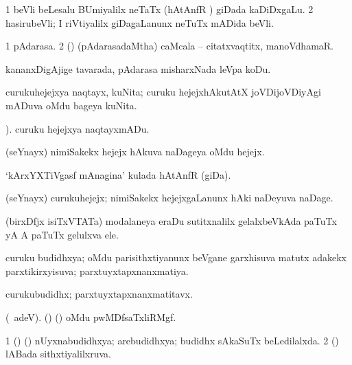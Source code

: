 \bentry
{}
\gl{\nA}
\expl{}
\bmng
\bnum
\num{1} beVli beLesalu BUmiyalilx neTaTx (hAtAnfR \mo) giDada kaDiDxgaLu. 
\num{2} hasirubeVli; I riVtiyalilx giDagaLanunx neTuTx mADida beVli. 
\enum
\emng
\eentry

\bentry
{}
\gl{\nA}
\bmng
\bnum
\num{1} pAdarasa. 
\num{2} (\rUpa) (pAdarasadaMtha) caMcala -- citatxvaqtitx, manoVdhamaR. 
\enum
\emng
\eentry

\bentry
{}
\gl{\sakirx}
\expl{}
\bmng
kananxDigAjige tavarada, pAdarasa misharxNada leVpa koDu. 
\emng
\eentry

\bentry
{}
\gl{\nA}
\bmng
curukuhejejxya naqtayx, kuNita; curuku hejejxhAkutAtX joVDijoVDiyAgi mADuva oMdu bageya kuNita. 
\emng
\eentry

\bentry
{}
\gl{\akirx}
).\bmng
curuku hejejxya naqtayxmADu. 
\emng
\eentry

\bentry
{}
\gl{\nA}
\bmng
(seYnayx) nimiSakekx  hejejx hAkuva naDageya oMdu hejejx. 
\emng
\eentry

\bentry
{}
\gl{\nA}
\bmng
`kArxYXTiVgasf mAnagina' kulada hAtAnfR (giDa). 
\emng
\eentry

\bentry
{}
\gl{\nA}
\bmng
(seYnayx) curukuhejejx; nimiSakekx  hejejxgaLanunx hAki naDeyuva naDage. 
\emng
\eentry

\bentry
{}
\gl{\nA}
\bmng
(birxDfjx isiTxVTATa) modalaneya eraDu sutitxnalilx gelalxbeVkAda paTuTx yA A paTuTx gelulxva ele. 
\emng
\eentry

\bentry
{}
\gl{\gu}
\bmng
curuku budidhxya; oMdu parisithxtiyanunx beVgane garxhisuva matutx adakekx parxtikirxyisuva; parxtuyxtapxnanxmatiya. 
\emng
\eentry

\bentry
{}
\gl{\nA}
\bmng
curukubudidhx; parxtuyxtapxnanxmatitavx. 
\emng
\eentry

\bentry
{}
\gl{\nA}
\bmng
 (\bava\ adeV). (\birx) (\ashi) oMdu pwMDfsaTxliRMgf. 
\emng

\noindent
\gl{\pagu}
\bmng
\bnum
\num{1}  (\AseTxrXV) (\ashi) nUyxnabudidhxya; arebudidhxya; budidhx sAkaSuTx beLedilalxda. 
\num{2}  (\ashi) lABada sithxtiyalilxruva. 
\enum
\emng
\eentry

